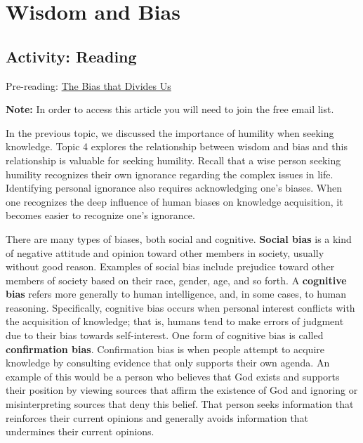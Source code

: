 \documentclass[
]{book}
\begin{document}
\hypertarget{wisdom-and-bias}{%
\section{Wisdom and Bias}\label{wisdom-and-bias}}

\hypertarget{activity-reading-3}{%
\subsection*{Activity: Reading}\label{activity-reading-3}}

\begin{reflect}
Pre-reading: \href{https://quillette.com/2020/09/26/the-bias-that-divides-us/}{The Bias that Divides Us}

\textbf{Note:} In order to access this article you will need to join the free email list.
\end{reflect}

In the previous topic, we discussed the importance of humility when seeking knowledge. Topic 4 explores the relationship between wisdom and bias and this relationship is valuable for seeking humility. Recall that a wise person seeking humility recognizes their own ignorance regarding the complex issues in life. Identifying personal ignorance also requires acknowledging one's biases. When one recognizes the deep influence of human biases on knowledge acquisition, it becomes easier to recognize one's ignorance.

There are many types of biases, both social and cognitive. \textbf{Social bias} is a kind of negative attitude and opinion toward other members in society, usually without good reason. Examples of social bias include prejudice toward other members of society based on their race, gender, age, and so forth. A \textbf{cognitive bias} refers more generally to human intelligence, and, in some cases, to human reasoning. Specifically, cognitive bias occurs when personal interest conflicts with the acquisition of knowledge; that is, humans tend to make errors of judgment due to their bias towards self-interest. One form of cognitive bias is called \textbf{confirmation bias}. Confirmation bias is when people attempt to acquire knowledge by consulting evidence that only supports their own agenda. An example of this would be a person who believes that God exists and supports their position by viewing sources that affirm the existence of God and ignoring or misinterpreting sources that deny this belief. That person seeks information that reinforces their current opinions and generally avoids information that undermines their current opinions.
\end{document}

